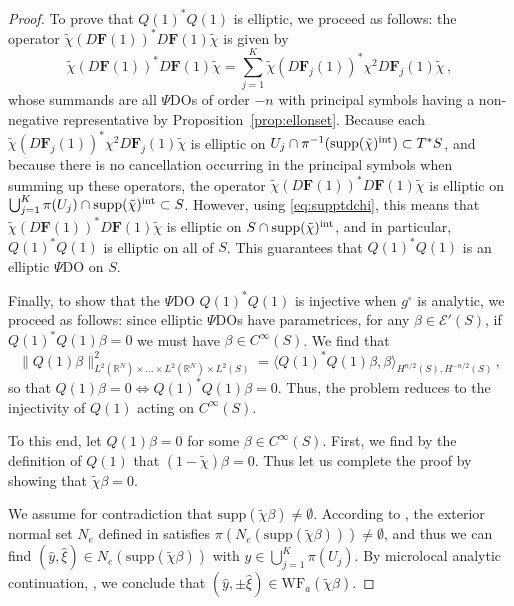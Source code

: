 \documentclass[11pt]{amsart}
\theoremstyle{definition}
\numberwithin{equation}{section}
\newcommand{\mR}{\mathbb{R}}                    %
\newcommand{\norm}[1]{\lVert #1 \rVert}         %
\newcommand{\supp}{\mathrm{supp}}
\begin{document}
\begin{proof}

	To prove that $Q(1)^\ast Q(1)$ is elliptic, we proceed as follows: the operator $\tilde{\chi}(D\mathbf{F}(1))^\ast D\mathbf{F}(1)\tilde{\chi}$ is given by
	\[
	\tilde{\chi}(D\mathbf{F}(1))^\ast D\mathbf{F}(1) \tilde{\chi}= \sum_{j=1}^K \tilde{\chi}(D\mathbf{F}_j(1))^\ast \chi^2 D\mathbf{F}_j(1) \tilde{\chi}\,,
	\]
	whose summands are all $\Psi$DOs of order $-n$ with principal symbols having a non-negative representative by Proposition~\ref{prop:ellonset}. Because each $\tilde{\chi}(D\mathbf{F}_j(1))^\ast \chi^2 D\mathbf{F}_j(1) \tilde{\chi}$ is elliptic on $U_j\cap \pi^{-1}(\supp(\tilde{\chi})^{\rm int})\subset T^\ast S$, and because there is no cancellation occurring in the principal symbols when summing up these operators, the operator $\tilde{\chi}(D\mathbf{F}(1))^\ast D\mathbf{F}(1)\tilde{\chi}$ is elliptic on $\bigcup_{j=1}^K \pi(U_j) \cap \supp(\tilde{\chi})^{\rm int} \subset S$. However, using \eqref{eq:supptdchi}, this means that $\tilde{\chi}(D\mathbf{F}(1))^\ast D\mathbf{F}(1)\tilde{\chi}$ is elliptic on $S\cap \supp(\tilde{\chi})^{\rm int}$, and in particular, $Q(1)^\ast Q(1)$ is elliptic on all of $S$. This guarantees that $Q(1)^\ast Q(1)$ is an elliptic $\Psi$DO on $S$.


	Finally, to show that the $\Psi$DO $Q(1)^\ast Q(1)$ is injective when $g^\circ$ is analytic, we proceed as follows: since elliptic $\Psi$DOs have parametrices, for any $\beta\in \mathcal{E}'(S)$, if $Q(1)^\ast Q(1)\beta = 0$ we must have $\beta \in C^\infty(S)$. We find that
	\[
		\norm{Q(1) \beta}_{L^2(\mR^{N})\times\dots\times L^2(\mR^{N})\times L^2(S)}^2 =  \langle Q(1)^\ast Q(1)\beta,\beta \rangle_{H^{n/2}(S), H^{-n/2}(S)}\,,
	\]
	so that $Q(1) \beta = 0 \iff Q(1)^\ast Q(1) \beta = 0$. Thus, the problem reduces to the injectivity of $Q(1)$ acting on $C^\infty(S)$.%

To this end, let $Q(1)\beta =0$ for some $\beta\in C^\infty(S)$. First, we find by the definition of $Q(1)$ that $(1-\tilde{\chi})\beta = 0$. Thus let us complete the proof by showing that $\tilde{\chi}\beta = 0$.
	
	We assume for contradiction that $\supp(\tilde{\chi}\beta )\neq \emptyset$. According to \cite[Prop.~8.5.8]{hoermander1}, the exterior normal set $N_e$ defined in \cite[Def.~8.5.7]{hoermander1} satisfies $\pi \left( N_e(\supp(\tilde{\chi}\beta))\right)  \neq \emptyset$, and thus we can find $(\hat y,\hat \xi)\in N_e(\supp(\tilde{\chi}\beta))$ with $\hat y\in \bigcup_{j=1}^K \pi\left( U_j\right)$. By microlocal analytic continuation, \cite[Thm.~8.5.6']{hoermander1}, we conclude that $(\hat y,\pm\hat\xi) \in \mathrm{WF}_a(\tilde{\chi}\beta)$.



\end{proof}
\end{document}
